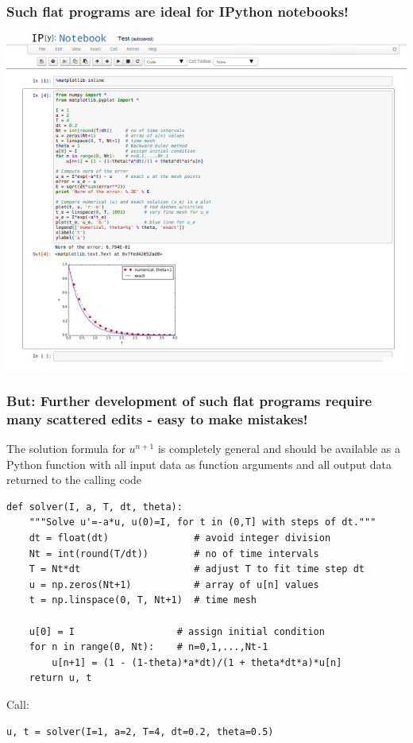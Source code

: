 \documentclass{beamer}
\begin{document}
\begin{frame}
\frametitle{Such flat programs are ideal for IPython notebooks!}

\centerline{\includegraphics[width=0.9\linewidth]{fig-softeng/ipynb_flat.png}}
\end{frame}

\begin{frame}
\frametitle{But: Further development of such flat programs require many scattered edits - easy to make mistakes!}

\begin{center}
\begin{Sbox}
\begin{minipage}{0.85\linewidth}
The solution formula for $u^{n+1}$ is completely general and
should be available as a Python function with all input data as
function arguments and all output data returned to the calling code
\end{minipage}
\end{Sbox}
\fbox{\TheSbox}
\end{center}

\begin{verbatim}
def solver(I, a, T, dt, theta):
    """Solve u'=-a*u, u(0)=I, for t in (0,T] with steps of dt."""
    dt = float(dt)               # avoid integer division
    Nt = int(round(T/dt))        # no of time intervals
    T = Nt*dt                    # adjust T to fit time step dt
    u = np.zeros(Nt+1)           # array of u[n] values
    t = np.linspace(0, T, Nt+1)  # time mesh

    u[0] = I                  # assign initial condition
    for n in range(0, Nt):    # n=0,1,...,Nt-1
        u[n+1] = (1 - (1-theta)*a*dt)/(1 + theta*dt*a)*u[n]
    return u, t
\end{verbatim}

Call:

\begin{verbatim}
u, t = solver(I=1, a=2, T=4, dt=0.2, theta=0.5)
\end{verbatim}
\end{frame}
\end{document}
